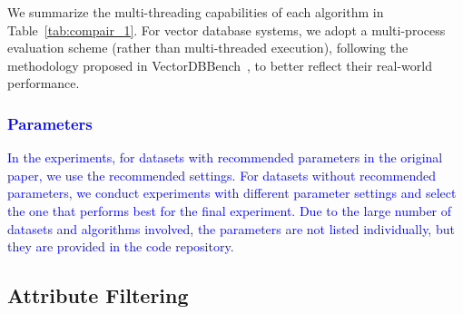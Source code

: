 \documentclass[sigconf, nonacm]{acmart}
\begin{document}
	We summarize the multi-threading capabilities of each algorithm in Table~\ref{tab:compair_1}. For vector database systems, we adopt a multi-process evaluation scheme (rather than multi-threaded execution), following the methodology proposed in VectorDBBench~\cite{VectorDBBench}, to better reflect their real-world performance.
	
	\textcolor{blue}{
	\subsubsection{Parameters}
	In the experiments, for datasets with recommended parameters in the original paper, we use the recommended settings. For datasets without recommended parameters, we conduct experiments with different parameter settings and select the one that performs best for the final experiment. Due to the large number of datasets and algorithms involved, the parameters are not listed individually, but they are provided in the code repository.
}
	
	
	\subsection{Attribute Filtering}
	
	
\end{document}
